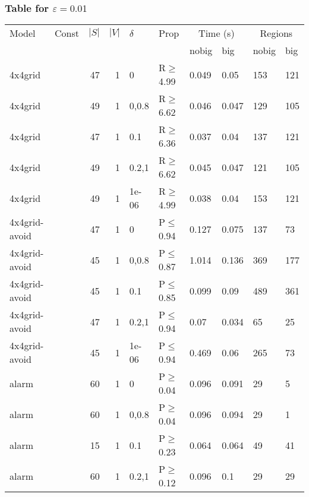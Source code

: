\subsubsection{Table for \(\varepsilon=0.01\)}
\begin{longtable}{llrrllllll}

        \toprule
        Model & Const & $|S|$ & $|V|$ & $\delta$ & Prop & \multicolumn{2}{c}{Time (s)} & \multicolumn{2}{c}{Regions} \\
        \cmidrule(ll){7-8} \cmidrule(ll){9-10}
        & & & & & & nobig & big & nobig & big \\
        \midrule
        
 4x4grid       &          &     	47 & 1 & 0     & R$\geq$4.99  & 0.049   & 0.05     & 153    & 121    \\
 4x4grid       &          &     	49 & 1 & 0,0.8 & R$\geq$6.62  & 0.046   & 0.047    & 129    & 105    \\
 4x4grid       &          &     	47 & 1 & 0.1   & R$\geq$6.36  & 0.037   & 0.04     & 137    & 121    \\
 4x4grid       &          &     	49 & 1 & 0.2,1 & R$\geq$6.62  & 0.045   & 0.047    & 121    & 105    \\
 4x4grid       &          &     	49 & 1 & 1e-06 & R$\geq$4.99  & 0.038   & 0.04     & 153    & 121    \\
 4x4grid-avoid &          &     	47 & 1 & 0     & P$\leq$0.94  & 0.127   & 0.075    & 137    & 73     \\
 4x4grid-avoid &          &     	45 & 1 & 0,0.8 & P$\leq$0.87  & 1.014   & 0.136    & 369    & 177    \\
 4x4grid-avoid &          &     	45 & 1 & 0.1   & P$\leq$0.85  & 0.099   & 0.09     & 489    & 361    \\
 4x4grid-avoid &          &     	47 & 1 & 0.2,1 & P$\leq$0.94  & 0.07    & 0.034    & 65     & 25     \\
 4x4grid-avoid &          &     	45 & 1 & 1e-06 & P$\leq$0.94  & 0.469   & 0.06     & 265    & 73     \\
 alarm         &          &     	60 & 1 & 0     & P$\geq$0.04  & 0.096   & 0.091    & 29     & 5      \\
 alarm         &          &     	60 & 1 & 0,0.8 & P$\geq$0.04  & 0.096   & 0.094    & 29     & 1      \\
 alarm         &          &     	15 & 1 & 0.1   & P$\geq$0.23  & 0.064   & 0.064    & 49     & 41     \\
 alarm         &          &     	60 & 1 & 0.2,1 & P$\geq$0.12  & 0.096   & 0.1      & 29     & 29     \\

\end{longtable}
